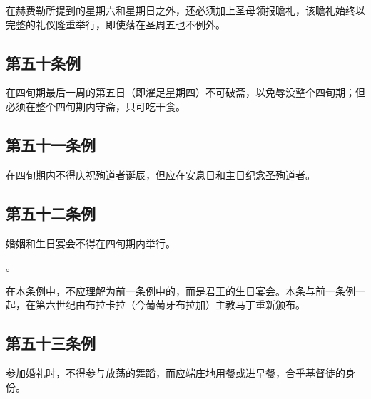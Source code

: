 在赫费勒所提到的星期六和星期日之外，还必须加上圣母领报瞻礼，该瞻礼始终以完整的礼仪隆重举行，即使落在圣周五也不例外。\par


\subsection{第五十条例}

在四旬期最后一周的第五日（即濯足星期四）不可破斋，以免辱没整个四旬期；但必须在整个四旬期内守斋，只可吃干食。\par


\subsection{第五十一条例}

在四旬期内不得庆祝殉道者诞辰，但应在安息日和主日纪念圣殉道者。\par


\subsection{第五十二条例}

婚姻和生日宴会不得在四旬期内举行。\par

。\par

在本条例中，不应理解为前一条例中的，而是君王的生日宴会。本条与前一条例一起，在第六世纪由布拉卡拉（今葡萄牙布拉加）主教马丁重新颁布。\par


\subsection{第五十三条例}

参加婚礼时，不得参与放荡的舞蹈，而应端庄地用餐或进早餐，合乎基督徒的身份。\par

